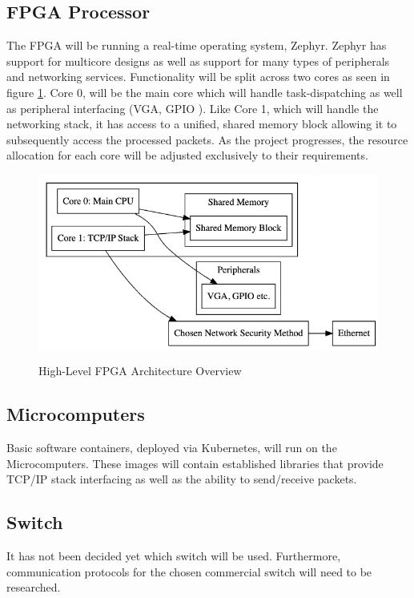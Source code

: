 \subsection{FPGA Processor}
The FPGA will be running a real-time operating system, Zephyr. Zephyr has support for multicore designs as well as support for many types of peripherals and networking services. Functionality will be split across two cores as seen in figure \ref{Fig:2}. Core 0, will be the main core which will handle task-dispatching as well as peripheral interfacing (VGA, GPIO \etc). Like Core 1, which will handle the networking stack, it has access to a unified, shared memory block allowing it to subsequently access the processed packets. As the project progresses, the resource allocation for each core will be adjusted exclusively to their requirements.
\begin{figure}[h]
    \begin{center}
    \caption{High-Level FPGA Architecture Overview}
    \includegraphics[width=1.0\textwidth]{./Figures/FPGA_Architecture_High_Level.png}
    \label{Fig:2}
    \end{center}
\end{figure}
\subsection{Microcomputers}
Basic software containers, deployed via Kubernetes, will run on the Microcomputers. These images will contain established libraries that provide TCP/IP stack interfacing as well as the ability to send/receive packets.
\subsection{Switch}
It has not been decided yet which switch will be used. Furthermore, communication protocols for the chosen commercial switch will need to be researched.
